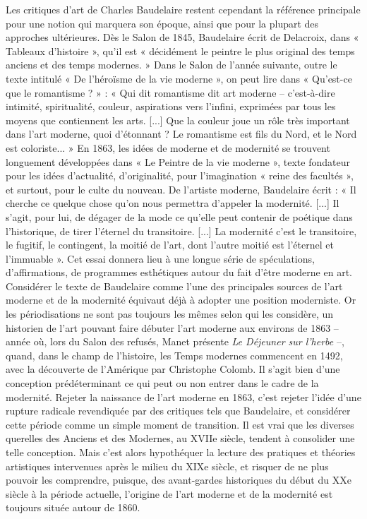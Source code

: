 Les critiques d'art de Charles Baudelaire restent cependant la référence principale pour une notion qui marquera son époque, ainsi que pour la plupart des approches ultérieures. Dès le Salon de 1845, Baudelaire écrit de Delacroix, dans « Tableaux d'histoire », qu'il est
« décidément le peintre le plus original des temps anciens et des temps modernes. » Dans le Salon de l'année suivante, outre le texte intitulé « De l'héroïsme de la vie moderne », on
peut lire dans « Qu'est-ce que le romantisme ? » : « Qui dit romantisme dit art moderne – c'est-à-dire intimité, spiritualité, couleur, aspirations vers l'infini, exprimées par tous les moyens que contiennent les arts. [...] Que la couleur joue un rôle très important dans l'art moderne, quoi d'étonnant ? Le romantisme est fils du Nord, et le Nord est coloriste... »
En 1863, les idées de moderne et de modernité se trouvent longuement développées dans
« Le Peintre de la vie moderne », texte fondateur pour les idées d'actualité, d'originalité, pour l'imagination « reine des facultés », et surtout, pour le culte du nouveau. De l'artiste moderne, Baudelaire écrit : « Il cherche ce quelque chose qu'on nous permettra d'appeler la modernité. [...] Il s'agit, pour lui, de dégager de la mode ce qu'elle peut contenir de poétique dans l'historique, de tirer l'éternel du transitoire. [...] La modernité c'est le transitoire, le fugitif, le contingent, la moitié de l'art, dont l'autre moitié est l'éternel et l'immuable ». Cet essai donnera lieu à une longue série de spéculations, d'affirmations, de programmes esthétiques autour du fait d'être moderne en art.
Considérer le texte de Baudelaire comme l'une des principales sources de l'art moderne et de la modernité équivaut déjà à adopter une position moderniste. Or les périodisations ne sont pas toujours les mêmes selon qui les considère, un historien de l'art pouvant faire débuter l'art moderne aux environs de 1863 – année où, lors du Salon des refusés, Manet présente \textit{Le Déjeuner sur l'herbe} –, quand, dans le champ de l'histoire, les Temps modernes commencent en 1492, avec la découverte de l'Amérique par Christophe Colomb.
Il s'agit bien d'une conception prédéterminant ce qui peut ou non entrer dans le cadre de la modernité. Rejeter la naissance de l'art moderne en 1863, c'est rejeter l'idée d'une rupture radicale revendiquée par des critiques tels que Baudelaire, et considérer cette période comme un simple moment de transition. Il est vrai que les diverses querelles des Anciens et des Modernes, au XVIIe siècle, tendent à consolider une telle conception. Mais c'est alors hypothéquer la lecture des pratiques et théories artistiques intervenues après le milieu du XIXe siècle, et risquer de ne plus pouvoir les comprendre, puisque, des avant-gardes historiques du début du XXe siècle à la période actuelle, l'origine de l'art moderne et de la modernité est toujours située autour de 1860.
